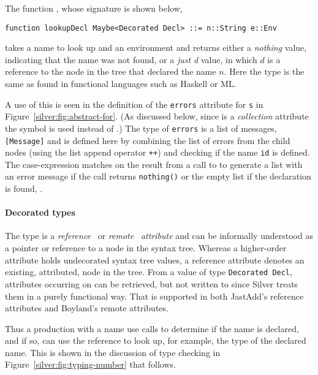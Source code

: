 The function , whose signature is shown below,
\begin{verbatim}
function lookupDecl Maybe<Decorated Decl> ::= n::String e::Env
\end{verbatim}
takes a name to look up and an environment and
returns either a \emph{nothing} value, indicating that the name was
not found, or a \emph{just d} value, in which $d$ is a reference to
the  node in the tree that declared the name $n$.
Here the  type is the same as found in functional
languages such as Haskell or ML.

A use of this is seen in the definition of the \texttt{errors}
attribute for \texttt{s} in Figure~\ref{silver:fig:abstract-for}. 
(As discussed below, since  is a \emph{collection}
attribute the \code{:=} symbol is used instead of \code{=}.)
The type of \texttt{errors} is a list of messages, \texttt{[Message]}
and is defined here by combining the list of errors from the child
nodes (using the list append operator \texttt{++}) and checking if the
name \texttt{id} is defined.
%
The case-expression matches on the result from a call to
 to generate a list with an error message if the call
returns \texttt{nothing()} or the empty list if the declaration is
found, .

\paragraph{Decorated types}
The type  is
  a \emph{reference}~\cite{hedin00informatica}
  or \emph{remote}~\cite{boyland05} \emph{attribute} and can be
  informally understood as a pointer or reference to a 
  node in the syntax tree.
%
Whereas a higher-order attribute holds undecorated syntax tree values,
a reference attribute denotes an existing,
attributed, node in the tree.
%
From a value of type \texttt{Decorated Decl}, attributes occurring on
 can be retrieved, but not written to
since Silver treats them in a purely functional way.  That is
supported in both JastAdd's reference attributes and Boyland's remote
attributes. 
%
%


%
Thus a production with a name use calls  to determine
if the name is declared, and if so, can use the reference to look up,
for example, the type of the declared name. This is shown in the
discussion of type checking in Figure~\ref{silver:fig:typing-number}
that follows.

